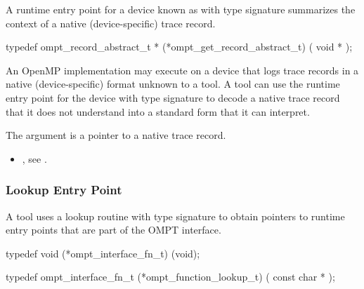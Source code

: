\summary
A runtime entry point for a device known as
with type signature
summarizes the context of a native (device-specific) trace record.

\format
\begin{ccppspecific}
\begin{omptOther}
typedef ompt_record_abstract_t *
(*ompt_get_record_abstract_t) (
  void *
);
\end{omptOther}
\end{ccppspecific}

\descr
An OpenMP implementation may execute on a device that logs
trace records in a native (device-specific) format unknown to a tool.
A tool can use the 
runtime entry point for the device with type signature
to decode a native trace record that it
does not understand into a standard form that it can interpret.

\argdesc

The argument  is a pointer to a native trace
record.

\crossreferences
\begin{itemize}
\item {},
see .
\end{itemize}

\subsubsection{Lookup Entry Point}

\label{sec:ompt_function_lookup_t}
\label{sec:ompt_function_lookup}

\summary
A tool uses a lookup routine with type signature
to obtain pointers to runtime entry points that are
part of the OMPT interface.

\format

\begin{ccppspecific}
\begin{omptInquiry}
typedef void (*ompt_interface_fn_t) (void);

typedef ompt_interface_fn_t (*ompt_function_lookup_t) (
  const char *
);
\end{omptInquiry}
\end{ccppspecific}


